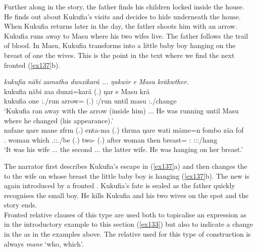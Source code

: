 Further along in the story, the father finds his children locked inside the house. He finds out about Kukufia's visits and decides to hide underneath the house. When Kukufia returns later in the day, the father shoots him with an arrow. Kukufia runs away to Masu where his two wifes live. The father follows the trail of blood. In Masu, Kukufia transforms into a little baby boy hanging on the breast of one the wives. This is the point in the text where we find the next fronted  (\ref{ex137}b).

\begin{exe}
	\ex \label{ex137}
	\begin{xlist}
	\ex
	\emph{kukufia näbi zamatha dunzikarä ... ŋakwir e Masu kräkwther.}\\
	\gll kukufia näbi zaa dunzi=karä (.) ŋar e Masu krä\\
	kukufia one \Tsg:\Pst.\Pfv/run arrow=\Prop{} (.) \Tsg:\Nonpast/run until masu \Tsg:\Irr.\Pfv/change \\
	\trans `Kukufia ran away with the arrow (inside him) ... He was running until Masu where he changed (his appearance).'
	\\
	\gll nafane ŋare mane zfrm (.) enta-ma (.) thrma ŋare wati mäme=n fombo zäa fof\\
	\Tsg.\Poss{} woman which \Tsg.\F:\Sbj:\Pst.\Dur/be (.) two-\Char{} (.) after woman then breast=\Loc{} \Dist:\All{} \Stsg:\Sbj:\Pst:\Pfv/hang \Emph{}\\
	\trans `It was his wife ... the second ... the latter wife. He was hanging on her breast.'
	\end{xlist}
\end{exe}

The narrator first describes Kukufia's escape in (\ref{ex137}a) and then changes the  to the wife on whose breast the little baby boy is hanging (\ref{ex137}b). The new  is again introduced by a fronted . Kukufia's fate is sealed as the father quickly recognises the small boy. He kills Kukufia and his two wives on the spot and the story ends.\\

Fronted relative clauses of this type are used both to topicalise an expression as in the introductory example to this section (\ref{ex133}) but also to indicate a change in the  as in the examples above. The relative  used for this type of construction is always \emph{mane} `who, which'.

